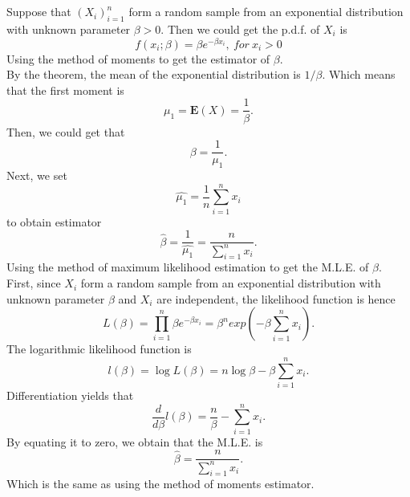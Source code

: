 \documentclass[10.5pt]{article}
\begin{document}
\section{}
Suppose that $(X_i)_{i=1}^n$ form a random sample from an exponential distribution with unknown parameter $\beta>0$. Then we could get the p.d.f. of $X_i$ is $$f(x_i;\beta)=\beta e^{-\beta x_i},~for ~x_i>0$$\indent
Using the method of moments to get the estimator of $\beta$.\\\indent 
By the theorem, the mean of the exponential distribution is $1/\beta$. Which means that the first moment is $$\mu_1=\mathbf{E}(X)=\frac{1}{\beta}.$$\indent
Then, we could get that $$\beta=\frac{1}{\mu_1}.$$\indent
Next, we set $$\hat{\mu_1}=\frac{1}{n}\sum_{i=1}^nx_i$$\indent
to obtain estimator $$\hat{\beta}=\frac{1}{\hat{\mu_1}}=\frac{n}{\sum_{i=1}^nx_i}.$$\indent
Using the method of maximum likelihood estimation to get the M.L.E. of $\beta$.\\\indent
First, since $X_i$ form a random sample from an exponential distribution with unknown parameter $\beta$ and $X_i$ are independent, the likelihood function is hence $$L(\beta)=\prod_{i=1}^n\beta e^{-\beta x_i}=\beta^nexp(-\beta\sum_{i=1}^nx_i).$$\indent
The logarithmic likelihood function is $$l(\beta)=\log L(\beta)=n\log\beta-\beta\sum_{i=1}^nx_i.$$\indent
Differentiation yields that $$\frac{d}{d\beta}l(\beta)=\frac{n}{\beta}-\sum_{i=1}^nx_i.$$\indent
By equating it to zero, we obtain that the M.L.E. is $$\hat{\beta}=\frac{n}{\sum_{i=1}^nx_i}.$$\indent
Which is the same as using the method of moments estimator.
\end{document}
